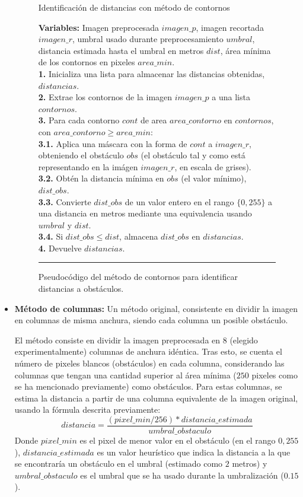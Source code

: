 \begin{itemize}
\begin{figure}[h]
\begin{algorithm}[H]
\caption{Identificación de distancias con método de contornos}
\textbf{Variables:} Imagen preprocesada $imagen\_p$, imagen recortada $imagen\_r$, umbral usado durante preprocesamiento $umbral$, distancia estimada hasta el umbral en metros $dist$, área mínima de los contornos en pixeles $area\_min$.\\
\textbf{1.} Inicializa una lista para almacenar las distancias obtenidas, $distancias$.\\
\textbf{2.} Extrae los contornos de la imagen $imagen\_p$ a una lista $contornos$.\\
\textbf{3.} Para cada contorno $cont$ de area $area\_contorno$ en $contornos$, con $area\_contorno \geq area\_min$:\\
\Indp \textbf{3.1.} Aplica una máscara con la forma de $cont$ a $imagen\_r$, obteniendo el obstáculo $obs$ (el obstáculo tal y como está representando en la imágen $imagen\_r$, en escala de grises).\\
\textbf{3.2.} Obtén la distancia mínima en $obs$ (el valor mínimo), $dist\_obs$.\\
\textbf{3.3.} Convierte $dist\_obs$ de un valor entero en el rango $\{0, 255\}$ a una distancia en metros mediante una equivalencia usando $umbral$ y $dist$.\\
\textbf{3.4.} Si $dist\_obs \leq dist$, almacena $dist\_obs$ en $distancias$.\\
\Indm \textbf{4.} Devuelve $distancias$.
\end{algorithm}
\hrule
\caption{Pseudocódigo del método de contornos para identificar distancias a obstáculos.}
\label{alg:contour}
\end{figure}

\newpage 

	\item \textbf{Método de columnas:} Un método original, consistente en dividir la imagen  en columnas de misma anchura, siendo cada columna un posible obstáculo. 
	
	El método consiste en dividir la imagen preprocesada en $8$ (elegido experimentalmente) columnas de anchura idéntica. Tras esto, se cuenta el número de pixeles blancos (obstáculos) en cada columna, considerando las columnas que tengan una cantidad superior al área mínima ($250$ pixeles como se ha mencionado previamente) como obstáculos. Para estas columnas, se estima la distancia a partir de una columna equivalente de la imagen original, usando la fórmula descrita previamente:
	\[distancia = \frac{(pixel\_min / 256) * distancia\_estimada}{umbral\_obstaculo}\]
Donde $pixel\_min$ es el pixel de menor valor en el obstáculo (en el rango ${0, 255}$), $distancia\_estimada$ es un valor heurístico que indica la distancia a la que se encontraría un obstáculo en el umbral (estimado como $2$ metros) y $umbral\_obstaculo$ es el umbral que se ha usado durante la umbralización ($0.15$).


\end{itemize}
